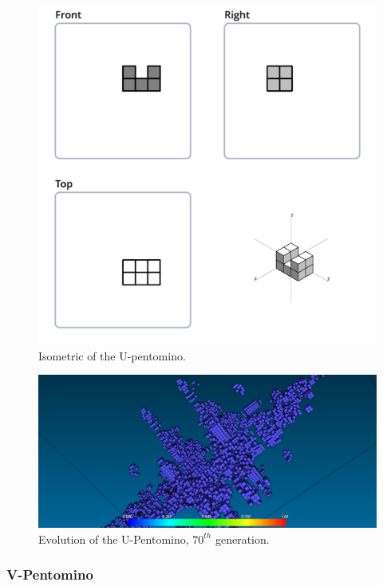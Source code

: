 \begin{figure}
	\centering
	\includegraphics[scale=0.3]{iso_diagrams/u.png}
	\caption{Isometric of the U-pentomino.}
  \label{fig:iso-pent-u}
\end{figure}

\begin{figure}
	\centering
	\includegraphics[scale=0.3]{pentominoes_ss/u_70.png}
	\caption{Evolution of the U-Pentomino, $70^{th}$ generation.}
	\label{fig:ss-pent:u-70}
\end{figure}

\subsubsection{V-Pentomino}
\label{sec:v-pentomino}

